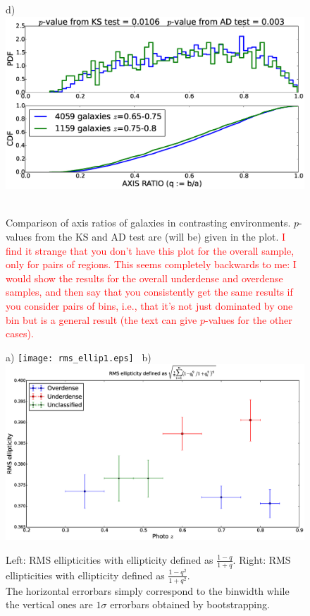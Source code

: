 \documentclass[twocolumn,useAMS,usenatbib]{mn2e}
\newcommand{\rachel}[1]{{\textcolor{red}{#1}}}
\begin{document}
\begin{figure}
 d) \includegraphics[width=0.9\columnwidth]{axisratio(0)_0dot65-0dot75_0dot75-0dot80.eps} \
 \caption{Comparison of axis ratios of galaxies in contrasting environments. $p$-values from the KS and AD test are (will be) given in the plot. \rachel{I find it strange that you don't have this plot for the overall sample, only for pairs of regions.  This seems completely backwards to me: I would show the results for the overall underdense and overdense samples, and then say that you consistently get the same results if you consider pairs of bins, i.e., that it's not just dominated by one bin but is a general result (the text can give $p$-values for the other cases).}}
 \label{fig:axisratio_contrasting}
\end{figure}


\begin{figure}
 \centering
 a) \texttt{[image: rms\_ellip1.eps]} \
 b) \includegraphics[width=0.9\columnwidth]{rms_ellip2_noevolution.eps} \\
 \caption{Left: RMS ellipticities with ellipticity defined as $\frac{1-q}{1+q}$. \; 
          Right: RMS ellipticities with ellipticity defined as $\frac{1-q^2}{1+q^2}$.\\ The horizontal errorbars simply correspond to the binwidth while the vertical ones
          are $1\sigma$ errorbars obtained by bootstrapping.}
 \label{fig:rms_ellip}
\end{figure}
\end{document}

